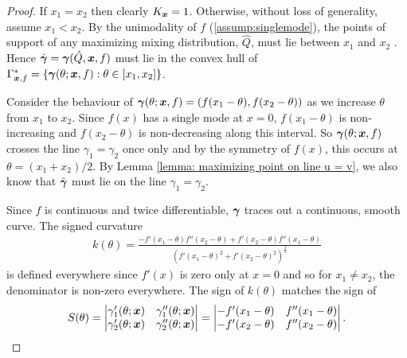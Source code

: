 		\label{sec:proof of n=2 inflection result}
		\begin{proof}
			If $x_1 = x_2$ then clearly $K_{\bm{{x}}} = 1$. Otherwise, without loss of generality, assume $x_1 < x_2$. By the unimodality of $f$ (\ref{assump:singlemode}), the points of support of any maximizing mixing distribution, $\hat{Q}$, must lie between $x_1$ and $x_2$ \cite[Proposition 25]{Lindsay1995-sq}. Hence $\hat{{\bm{{\gamma}}}} = {\bm{{\gamma}}}(\hat{Q}, {\bm{{x}}}, f)$ must lie in the convex hull of $\Gamma^*_{{\bm{{x}}}, f} = \{{\bm{{\gamma}}}(\theta; {\bm{{x}}}, f) : \theta \in [x_1, x_2]\}$. 

			Consider the behaviour of ${\bm{{\gamma}}}(\theta; {\bm{{x}}}, f) = (f(x_1 - \theta), f(x_2 - \theta))$ as we increase $\theta$ from $x_1$ to $x_2$. Since $f(x)$ has a single mode at $x = 0$, $f(x_1 - \theta)$ is non-increasing and $f(x_2 - \theta)$ is non-decreasing along this interval. So ${\bm{{\gamma}}}(\theta;{\bm{{x}}}, f)$ crosses the line $\gamma_1 = \gamma_2$ once only and by the symmetry of $f(x)$, this occurs at $\theta = (x_1 + x_2)/2$. By Lemma \ref{lemma: maximizing point on line u = v}, we also know that $\hat{{\bm{{\gamma}}}}$ must lie on the line $\gamma_1 = \gamma_2$.

			Since $f$ is continuous and twice differentiable, ${\bm{{\gamma}}}$ traces out a continuous, smooth curve. The signed curvature
			\begin{align}
				k(\theta) = \frac{-f'(x_1 - \theta)f''(x_2 - \theta) + f'(x_2 - \theta)f''(x_1 - \theta)}{(f'(x_1 - \theta)^2 + f'(x_2 - \theta)^2)^{\frac{3}{2}}}
			\end{align}
			is defined everywhere since $f'(x)$ is zero only at $x = 0$ and so for $x_1 \neq x_2$, the denominator is non-zero everywhere. The sign of $k(\theta)$ matches the sign of
			\begin{equation}
				S(\theta) = 
				\begin{vmatrix}
					\gamma_1'(\theta;{\bm{{x}}})&\gamma_1''(\theta;{\bm{{x}}})\\
					\gamma_2'(\theta;{\bm{{x}}})&\gamma_2''(\theta;{\bm{{x}}})
				\end{vmatrix} = 
				\begin{vmatrix}
					-f'(x_1 - \theta) & f''(x_1 - \theta)\\
					-f'(x_2 - \theta) & f''(x_2 - \theta)
				\end{vmatrix}.
			\end{equation}


\end{proof}

